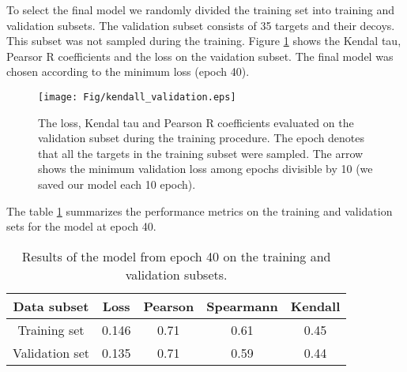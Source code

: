 To select the final model we randomly divided the training set into training and validation subsets. The validation subset consists of 
35 targets and their decoys. This subset was not sampled during the training. 
Figure \ref{Fig:TrainingLoss} shows the Kendal tau, Pearsor R coefficients and the loss on the vaidation subset. 
The final model was chosen according to the minimum loss (epoch 40).
\begin{figure}[H]
    \centering
    \texttt{[image: Fig/kendall\_validation.eps]}
    \caption{The loss, Kendal tau and Pearson R coefficients evaluated on the validation subset during the training procedure. 
    The epoch denotes that all the targets in the training subset were sampled. The arrow shows the minimum validation loss 
    among epochs divisible by 10 (we saved our model each 10 epoch).}
    \label{Fig:TrainingLoss}
\end{figure}

The table \ref{Tbl:TrainingResults} summarizes the performance metrics on the training and validation sets for the model at epoch 40.

\begin{table}[H]
\begin{center}
\begin{tabular}{ c | c | c | c | c }
    Data subset & Loss & Pearson & Spearmann & Kendall \\
    \hline
    Training set     &0.146 &0.71 &0.61 &0.45 \\
    Validation set   &0.135 &0.71 &0.59 &0.44 \\ \hline

\end{tabular}
  \caption {Results of the model from epoch 40 on the training and validation subsets.}
    \label{Tbl:TrainingResults}
\end{center}
\end{table}
